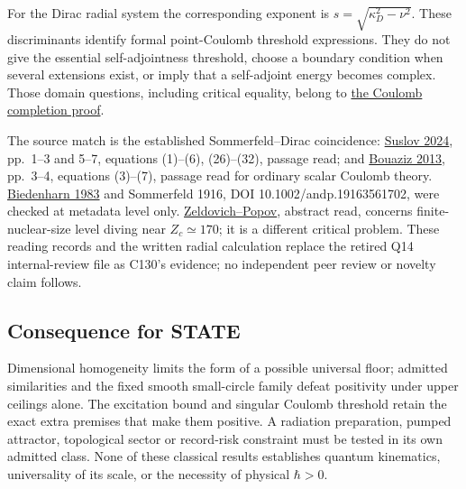 \documentclass[11pt,a4paper]{article}
\begin{document}
For the Dirac radial system the corresponding exponent is
\(s=\sqrt{\kappa_D^2-\nu^2}\). These discriminants identify formal
point-Coulomb threshold expressions. They do not give the essential
self-adjointness threshold, choose a boundary condition when several
extensions exist, or imply that a self-adjoint energy becomes complex.
Those domain questions, including critical equality, belong to
\href{self-sufficiency-contrast.md}{the Coulomb completion proof}.

The source match is the established Sommerfeld--Dirac coincidence:
\href{https://arxiv.org/abs/2401.07485}{Suslov 2024}, pp.~1--3 and 5--7,
equations (1)--(6), (26)--(32), passage read; and
\href{https://arxiv.org/abs/1311.7405}{Bouaziz 2013}, pp.~3--4,
equations (3)--(7), passage read for ordinary scalar Coulomb theory.
\href{https://doi.org/10.1007/BF01889408}{Biedenharn 1983} and
Sommerfeld 1916, DOI 10.1002/andp.19163561702, were checked at metadata
level only.
\href{https://doi.org/10.1070/PU1972v014n06ABEH004735}{Zeldovich--Popov},
abstract read, concerns finite-nuclear-size level diving near
\(Z_c\simeq170\); it is a different critical problem. These reading
records and the written radial calculation replace the retired Q14
internal-review file as C130's evidence; no independent peer review or
novelty claim follows.

\hypertarget{consequence-for-state}{%
\subsection{Consequence for STATE}\label{consequence-for-state}}

Dimensional homogeneity limits the form of a possible universal floor;
admitted similarities and the fixed smooth small-circle family defeat
positivity under upper ceilings alone. The excitation bound and singular
Coulomb threshold retain the exact extra premises that make them
positive. A radiation preparation, pumped attractor, topological sector
or record-risk constraint must be tested in its own admitted class. None
of these classical results establishes quantum kinematics, universality
of its scale, or the necessity of physical \(\hbar>0\).
\end{document}
